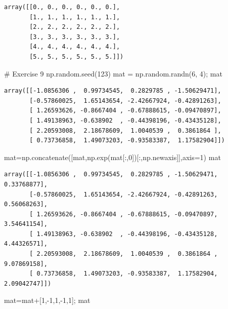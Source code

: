 \documentclass[
  a4paper,
  DIV=11,
  numbers=noendperiod]{scrreprt}
\newenvironment{Shaded}{\begin{snugshade}}{\end{snugshade}}
\newcommand{\CommentTok}[1]{\textcolor[rgb]{0.37,0.37,0.37}{#1}}
\newcommand{\DecValTok}[1]{\textcolor[rgb]{0.68,0.00,0.00}{#1}}
\newcommand{\NormalTok}[1]{\textcolor[rgb]{0.00,0.23,0.31}{#1}}
\newcommand{\OperatorTok}[1]{\textcolor[rgb]{0.37,0.37,0.37}{#1}}
\begin{document}
\begin{verbatim}
array([[0., 0., 0., 0., 0., 0.],
       [1., 1., 1., 1., 1., 1.],
       [2., 2., 2., 2., 2., 2.],
       [3., 3., 3., 3., 3., 3.],
       [4., 4., 4., 4., 4., 4.],
       [5., 5., 5., 5., 5., 5.]])
\end{verbatim}

\begin{Shaded}
\begin{Highlighting}[]
\CommentTok{\# Exercise 9}
\NormalTok{np.random.seed(}\DecValTok{123}\NormalTok{)}
\NormalTok{mat }\OperatorTok{=}\NormalTok{ np.random.randn(}\DecValTok{6}\NormalTok{, }\DecValTok{4}\NormalTok{)}\OperatorTok{;}\NormalTok{ mat}
\end{Highlighting}
\end{Shaded}

\begin{verbatim}
array([[-1.0856306 ,  0.99734545,  0.2829785 , -1.50629471],
       [-0.57860025,  1.65143654, -2.42667924, -0.42891263],
       [ 1.26593626, -0.8667404 , -0.67888615, -0.09470897],
       [ 1.49138963, -0.638902  , -0.44398196, -0.43435128],
       [ 2.20593008,  2.18678609,  1.0040539 ,  0.3861864 ],
       [ 0.73736858,  1.49073203, -0.93583387,  1.17582904]])
\end{verbatim}

\begin{Shaded}
\begin{Highlighting}[]
\NormalTok{mat}\OperatorTok{=}\NormalTok{np.concatenate([mat,np.exp(mat[:,}\DecValTok{0}\NormalTok{])[:,np.newaxis]],axis}\OperatorTok{=}\DecValTok{1}\NormalTok{)}
\NormalTok{mat}
\end{Highlighting}
\end{Shaded}

\begin{verbatim}
array([[-1.0856306 ,  0.99734545,  0.2829785 , -1.50629471,  0.33768877],
       [-0.57860025,  1.65143654, -2.42667924, -0.42891263,  0.56068263],
       [ 1.26593626, -0.8667404 , -0.67888615, -0.09470897,  3.54641154],
       [ 1.49138963, -0.638902  , -0.44398196, -0.43435128,  4.44326571],
       [ 2.20593008,  2.18678609,  1.0040539 ,  0.3861864 ,  9.07869158],
       [ 0.73736858,  1.49073203, -0.93583387,  1.17582904,  2.09042747]])
\end{verbatim}

\begin{Shaded}
\begin{Highlighting}[]
\NormalTok{mat}\OperatorTok{=}\NormalTok{mat}\OperatorTok{+}\NormalTok{[}\DecValTok{1}\NormalTok{,}\OperatorTok{{-}}\DecValTok{1}\NormalTok{,}\DecValTok{1}\NormalTok{,}\OperatorTok{{-}}\DecValTok{1}\NormalTok{,}\DecValTok{1}\NormalTok{]}\OperatorTok{;}\NormalTok{ mat}
\end{Highlighting}
\end{Shaded}
\end{document}
